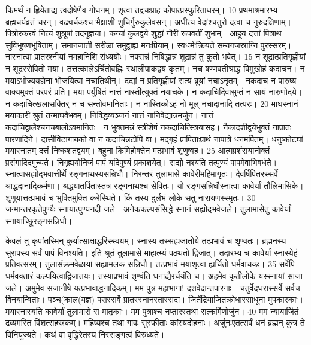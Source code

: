 किमर्थं न ह्रियेताद्य त्वदोषेणैव गोधनम्।
 शृत्वा तद्वचःप्राह कोपात्प्रस्फुरिताधरम्।
 10 प्रथमाश्रमारभ्य ब्रह्मचर्यव्रतं चरन्।
 वढ्यर्चकश्च भैक्षाशी शुचिर्गुरुकुलेवसन्।
 अधीत्य वेदांश्चतुरो दत्वा च गुरुदक्षिणाम्।
 पित्रोरकरवं नित्यं शुश्रूषां तदनुज्ञया।
 कन्यां कुलद्वये शुद्धां गौरी रूपवतीं शुभाम्।
 आहूय दत्तां पित्राथ सुविभूषणभूषिताम्।
 समानजाती सरीळां समुद्वाह्य मनःप्रियाम्।
 स्वधर्मःक्रियते सम्यगजस्राग्नि पुरस्सरम्।
 नास्नात्वा प्रातरश्नीयां नमहानिशि संध्ययोः।
 नपरान्नं निषिद्धान्नं शूद्रान्नं तु कुतो भवेत्।
 15 न शूद्रात्प्रतिगृह्णीयां न शूद्रस्सेवितो मया।
 तत्तत्कालेऽर्चितोवह्निः स्थालीपाकद्वयं कृतम्।
 नच षण्णवतीश्राद्ध विमुखोहं कदाचन।
 न मयाऽभोज्ययज्ञेना भोजयित्वा नचातिथीन्।
 दद्यां न प्रतिगृह्णीयां सत्यं ब्रूयां नचाऽनृतम्।
 नकदाच न पारुष्य वाक्यमुक्तं परंपरं प्रति।
 मया पर्युषितं नात्तं नास्तीत्युक्तं नयाचके।
 न कदाचिदिवासुप्तं न सायं नारुणोदये।
 न कदाचित्खलासक्तिर् न च सन्तोवमानिताः।
 न नास्तिकोऽहं नो मूल् नचादानादि तत्परः।
 20
माघस्नानं मयाकारी श्रुतं तन्माघवैभवम्।
 निषिद्धव्यञ्जनं नात्तं नानिवेद्यान्नमर्जुन।
 नात्तं कदाचिद्वालैश्चनचबालोऽवमानितः।
 न भुक्तमन्नं स्त्रीशेषं नकदाचित्स्त्रियासह।
 नैकादशीद्वयेभुक्तं नाप्रातः पारणादिने।
 दासीविटागायको वा न कदाचिन्नटोपि वा।
 मद्गृहं प्रापिताःप्रार्थ नापात्रे धनमर्पितम्।
 धनुष्कोट्यां मयास्नातम् दत्तं निष्कशतद्वयम्।
 बहुना किमिहोक्तेन मत्प्रभावं शृणुष्वह।
 25 आत्मप्रशंसयानोक्तं प्रसंगादिदमुच्यते।
 निगृह्ययोनिजं पापं यदिपुण्यं प्रकाशयेत्।
 सद्यो नश्यति तत्पुण्यं पापमेवाभिवर्धते।
 स्नात्वासह्योद्भवात्तीर्थे रङ्गनाथस्यसन्निधौ।
 निरन्तरं तुलामासे कावेरीमहिमागृतः।
 देवर्षिपितरस्सर्वे श्राद्धदानादिकर्मणा।
 श्रद्धयातर्पितास्तत्र रङ्गनाथश्च सेवितः।
 यो रङ्गसन्निधौस्नात्वा कावेर्यां तौलिमासिके।
 शृणुयात्तत्प्रभावं च भुक्तिमुक्ति करेस्थिते।
 किं तस्य दुर्लभं लोके सतु नारायणस्स्मृतः।
 30 जन्मान्तरकृतेपुण्यैः स्नायात्पुण्यनदी जले।
 अनेककल्पसंसिद्धे स्नानं सह्योद्भवेजले।
 तुलामासेतु कावेर्यां स्नायाच्छूिरङ्गसन्निधौ।
 
केवलं तु कृपांतस्मिन् कुर्यात्साक्षाद्धरिस्स्वयम्।
 स्नास्य तस्सह्यजातोये तत्प्रभावं च शृण्वतः।
 ब्रह्मनस्य सुरापस्य सर्वं पापं विनश्यति।
 इति श्रुतं तुलामासे माहात्म्यं पठथतो द्विजात्।
 तदारभ्य च कावेर्यां स्नास्येहं प्रतिवत्सरम्।
 तुलासंक्रमवेळायां सह्यामलक सन्निधौ।
 तत्प्रभावं मयाशृत्वा ह्यर्चितो धर्मवाचकः।
 35 सर्वेपि धर्मवक्तारं कल्पयित्वाद्विजातयः।
 तस्याप्रभावं शृण्वंति धनाद्यैरर्चयंति च।
 अहमेव कृतीलोके यस्स्नायां साजा जले।
 अमुमेव सजानीषे यत्प्रभावाद्धनादिकम्।
 मम पुत्र महाभागा! दशवेदान्तपारगाः।
 चतुर्वेदधरास्सर्वे सर्वच विनयान्विताः।
 पञ्च(काल(यज्ञ) परास्सर्वे प्रातस्स्नानरतास्सदा।
 जितेंद्रियाजितक्रोधास्साधूना मुपकारकाः।
 मयास्नास्यति कावेर्यां तुलामासे स मातृकाः।
 मम पुत्राश्च नप्तारस्तथा सत्कर्मिणोर्जुन।
 40 मम न्यायार्जितं द्रव्यमस्ति विंशत्सहस्रकम्।
 महिष्यश्च तथा गावः सुस्फीताः कांस्यदोहनाः।
 अर्जुनःएतत्सर्वं धनं ब्रह्मन् कुत्र ते विनियुज्यते।
 कथं वा वृद्धिरेतस्य निस्सङ्गत्वं विरुध्यते।
 
